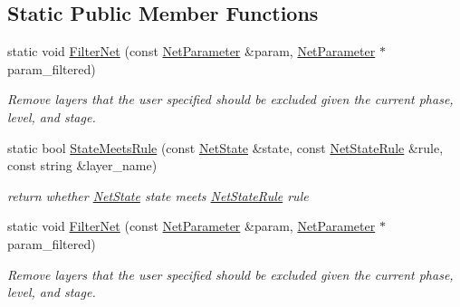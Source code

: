 \subsection*{Static Public Member Functions}
\begin{DoxyCompactItemize}
\item 
\mbox{\label{classcaffe_1_1_net_a4a38a77b5f01ba4754e6007b9f1214f8}} 
static void \mbox{\hyperlink{classcaffe_1_1_net_a4a38a77b5f01ba4754e6007b9f1214f8}{Filter\+Net}} (const \mbox{\hyperlink{classcaffe_1_1_net_parameter}{Net\+Parameter}} \&param, \mbox{\hyperlink{classcaffe_1_1_net_parameter}{Net\+Parameter}} $\ast$param\+\_\+filtered)
\begin{DoxyCompactList}\small\item\em Remove layers that the user specified should be excluded given the current phase, level, and stage. \end{DoxyCompactList}\item 
\mbox{\label{classcaffe_1_1_net_a54e8c43fe3a0cd9bbbcfdefd2b1603d2}} 
static bool \mbox{\hyperlink{classcaffe_1_1_net_a54e8c43fe3a0cd9bbbcfdefd2b1603d2}{State\+Meets\+Rule}} (const \mbox{\hyperlink{classcaffe_1_1_net_state}{Net\+State}} \&state, const \mbox{\hyperlink{classcaffe_1_1_net_state_rule}{Net\+State\+Rule}} \&rule, const string \&layer\+\_\+name)
\begin{DoxyCompactList}\small\item\em return whether \mbox{\hyperlink{classcaffe_1_1_net_state}{Net\+State}} state meets \mbox{\hyperlink{classcaffe_1_1_net_state_rule}{Net\+State\+Rule}} rule \end{DoxyCompactList}\item 
\mbox{\label{classcaffe_1_1_net_abdfb8549b95d178841e5012759042943}} 
static void \mbox{\hyperlink{classcaffe_1_1_net_abdfb8549b95d178841e5012759042943}{Filter\+Net}} (const \mbox{\hyperlink{classcaffe_1_1_net_parameter}{Net\+Parameter}} \&param, \mbox{\hyperlink{classcaffe_1_1_net_parameter}{Net\+Parameter}} $\ast$param\+\_\+filtered)
\begin{DoxyCompactList}\small\item\em Remove layers that the user specified should be excluded given the current phase, level, and stage. \end{DoxyCompactList}\item 
\mbox{\label{classcaffe_1_1_net_ae46e9be7aee32f16bcfcc8639afdd949}} 

\end{DoxyCompactItemize}
